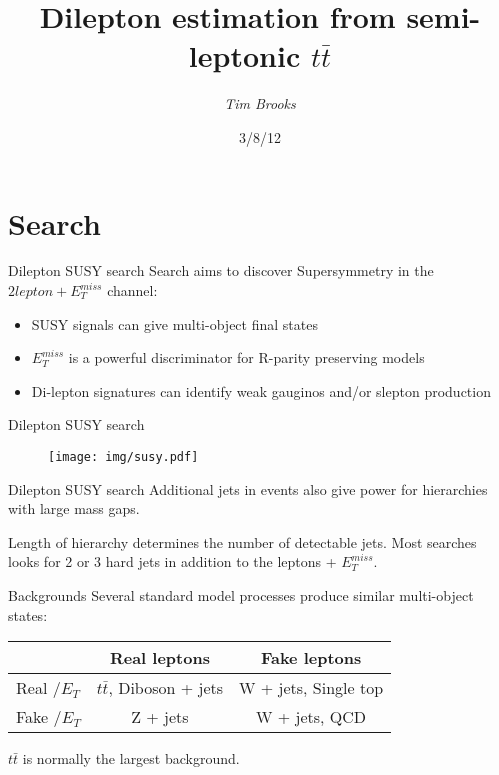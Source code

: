 \documentclass{beamer}
\title[Semi-leptonic control method\hspace{2em}\insertframenumber/
\inserttotalframenumber]{Dilepton estimation from semi-leptonic $t \bar{t}$}
\author{\emph{Tim Brooks}}
\institute{Royal Holloway University of London}
\date{3/8/12}
\begin{document}

\section{Search}
\begin{frame}{Dilepton SUSY search}
Search aims to discover Supersymmetry in the $2 lepton + E_{T}^{miss}$ channel:
  \begin{itemize}
    \item SUSY signals can give multi-object final states
    \item $E_{T}^{miss}$ is a powerful discriminator for R-parity preserving models
    \item Di-lepton signatures can identify weak gauginos and/or slepton production
  \end{itemize}
\end{frame}

\begin{frame}{Dilepton SUSY search}
  \begin{figure}
    \centering
    \texttt{[image: img/susy.pdf]}
  \end{figure}
\end{frame}

\begin{frame}{Dilepton SUSY search}
Additional jets in events also give power for hierarchies with large mass gaps.

Length of hierarchy determines the number of detectable jets. Most searches looks for 2 or 3 hard jets in addition to the leptons + $E_{T}^{miss}$.
\end{frame}

\begin{frame}{Backgrounds}
Several standard model processes produce similar multi-object states:

\begin{table}
\centering
\begin{tabular}{l||c|c}
                     & Real leptons               & Fake leptons         \\
\hline \hline
Real $\slash{E}_{T}$ & $t\bar{t}$, Diboson + jets & W + jets, Single top \\
\hline
Fake $\slash{E}_{T}$ & Z + jets                   & W + jets, QCD        \\
\end{tabular}
\label{tab:myfirsttable}
\end{table}

$t\bar{t}$ is normally the largest background.
\end{frame}
\end{document}
